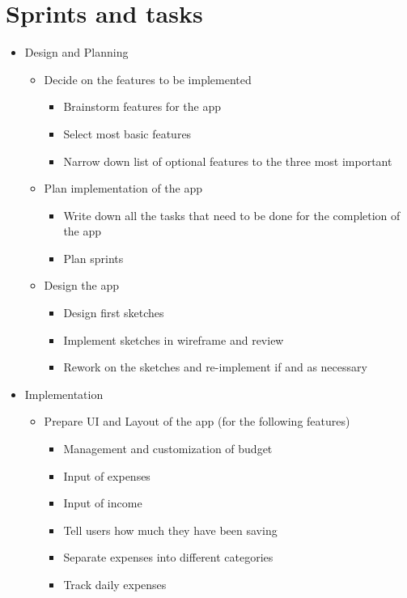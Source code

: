 \section{Sprints and tasks}
\begin{itemize}
  \item Design and Planning
  \begin{itemize}
    \item Decide on the features to be implemented
    \begin{itemize}
      \item Brainstorm features for the app
      \item Select most basic features
      \item Narrow down list of optional features to the three most important
    \end{itemize}
    \item Plan implementation of the app
    \begin{itemize}
      \item Write down all the tasks that need to be done for the completion of the app
      \item Plan sprints
    \end{itemize}
    \item Design the app
    \begin{itemize}
      \item Design first sketches
      \item Implement sketches in wireframe and review
      \item Rework on the sketches and re-implement if and as necessary
    \end{itemize}
  \end{itemize}
  \item Implementation
  \begin{itemize}
    \item Prepare UI and Layout of the app (for the following features)
    \begin{itemize}
      \item Management and customization of budget
      \item Input of expenses
      \item Input of income
      \item Tell users how much they have been saving
      \item Separate expenses into different categories
      \item Track daily expenses
    \end{itemize}

\end{itemize}
\end{itemize}
